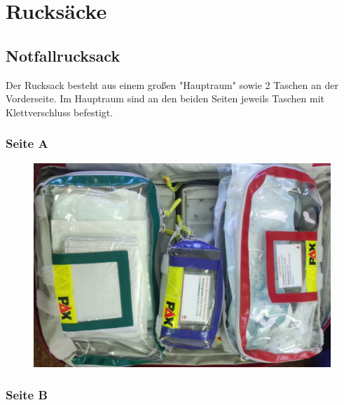 \chapter{Rucksäcke}
\section{Notfallrucksack}
Der Rucksack besteht aus einem großen "Hauptraum" sowie 2 Taschen an der Vorderseite.
Im Hauptraum sind an den beiden Seiten jeweils Taschen mit Klettverschluss befestigt.
\subsection*{Seite A}
\begin{figure}[H]
    \includegraphics[width=\textwidth]{res/rucksack_a.png}
    \centering
\end{figure}
\subsection*{Seite B}